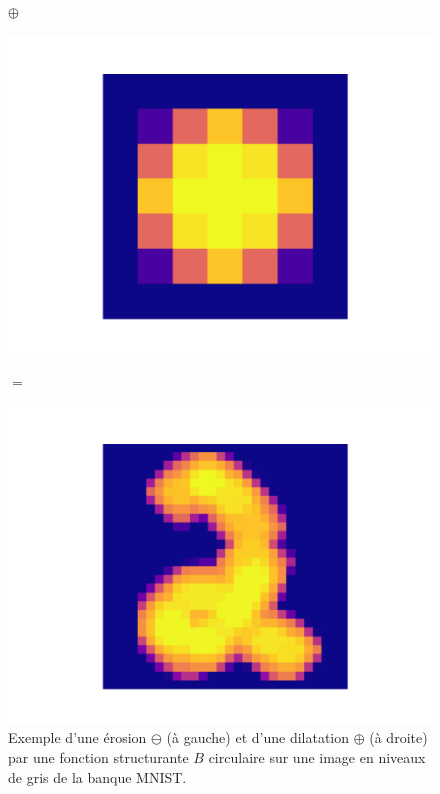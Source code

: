 \begin{figure}[h]
\begin{center}
\begin{minipage}{0.49\linewidth}
\begin{minipage}{0.04\linewidth}
        \centering
        \large $\oplus$
    \end{minipage}%
    \begin{minipage}{0.2\linewidth}
        \centering
        \includegraphics[width=0.7\linewidth]{figures/selem.pdf}
    \end{minipage}%
    \begin{minipage}{0.06\linewidth}
        \centering
        \large $=$
    \end{minipage}%
    \begin{minipage}{0.3\linewidth}
        \centering
        \includegraphics[width=1.0\textwidth]{figures/dilated.pdf}
    \end{minipage}
\end{minipage}%
    
    \caption{\centering Exemple d'une érosion $\ominus$ (à gauche) et d'une dilatation $\oplus$ (à droite) par une fonction structurante $B$ circulaire sur une image en niveaux de gris de la banque MNIST.}
    \label{fig:morpho_operations_example}
  \end{center}
\end{figure}


